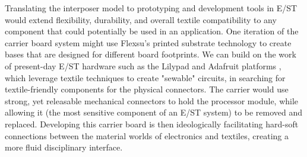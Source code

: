 \documentclass[manuscript,review,anonymous]{acmart}
\begin{document}
Translating the interposer model to prototyping and development tools in E/ST would extend flexibility, durability, and overall textile compatibility to any component that could potentially be used in an application. One iteration of the carrier board system might use Flexsu's printed substrate technology to create bases that are designed for different board footprints. We can build on the work of present-day E/ST hardware such as the Lilypad and Adafruit platforms \cite{buechley_lilypad_2008, posch_etextiles_2019, jones_wearable_2020}, which leverage textile techniques to create "sewable" circuits, in searching for textile-friendly components for the physical connectors. The carrier would use strong, yet releasable mechanical connectors to hold the processor module, while allowing it (the most sensitive component of an E/ST system) to be removed and replaced. 
Developing this carrier board is then ideologically facilitating hard-soft connections between the material worlds of electronics and textiles, creating a more fluid disciplinary interface.



\end{document}
